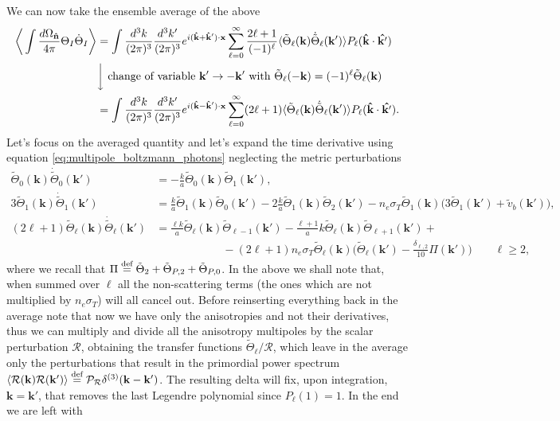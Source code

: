 We can now take the ensemble average of the above
\begin{align*}
    \bigg\langle\int\frac{d\Omega_{\mathbf{\hat{n}}}}{4\pi}\Theta_I\dot \Theta_I\bigg\rangle&=\int\frac{d^3k}{(2\pi)^3}\frac{d^3k'}{(2\pi)^3}e^{i(\mathbf{\hat{k}}+\mathbf{\hat{k}}')\cdot\mathbf{x}}\sum_{\ell=0}^{\infty}\frac{2\ell+1}{(-1)^{\ell}}\langle\tilde\Theta_\ell(\mathbf{k})\dot{\tilde\Theta}_{\ell}(\mathbf{k}')\rangle P_\ell(\mathbf{\hat{k}}\cdot\mathbf{\hat{k'}})\\
    &\bigg\downarrow\ \text{change of variable }\mathbf{k}'\rightarrow-\mathbf{k}'\text{ with } \tilde\Theta_\ell(-\mathbf{k})=(-1)^\ell \tilde\Theta_\ell(\mathbf{k})\\
    &=\int\frac{d^3k}{(2\pi)^3}\frac{d^3k'}{(2\pi)^3}e^{i(\mathbf{\hat{k}}-\mathbf{\hat{k}}')\cdot\mathbf{x}}\sum_{\ell=0}^{\infty}(2\ell+1)\langle\tilde\Theta_\ell(\mathbf{k})\dot{\tilde\Theta}_{\ell}(\mathbf{k}')\rangle P_\ell(\mathbf{\hat{k}}\cdot\mathbf{\hat{k'}}).
\end{align*}
Let's focus on the averaged quantity and let's expand the time derivative using equation \eqref{eq:multipole_boltzmann_photons} neglecting the metric perturbations
\begin{align*}
    \tilde\Theta_0(\mathbf{k})\dot{\tilde\Theta}_{0}(\mathbf{k}')&=-\frac{k}{a}\tilde\Theta_0(\mathbf{k})\tilde\Theta_1(\mathbf{k}'),&&\\
    3\tilde\Theta_1(\mathbf{k})\dot{\tilde\Theta}_{1}(\mathbf{k}')&=\frac{k}{a}\tilde\Theta_1(\mathbf{k})\tilde\Theta_0(\mathbf{k}')-2\frac{k}{a}\tilde\Theta_1(\mathbf{k})\tilde\Theta_2(\mathbf{k}')-n_e\sigma_T\tilde\Theta_1(\mathbf{k})\bigg( 3\tilde\Theta_1(\mathbf{k}')+\tilde v_b(\mathbf{k}') \bigg),&&\\
    (2\ell+1)\tilde\Theta_\ell(\mathbf{k})\dot{\tilde\Theta}_{\ell}(\mathbf{k}')&=\frac{\ell k}{a}\tilde\Theta_\ell(\mathbf{k})\tilde\Theta_{\ell-1}(\mathbf{k}')-\frac{\ell+1}{a}k\tilde\Theta_\ell(\mathbf{k})\tilde\Theta_{\ell+1}(\mathbf{k}')+\\&\qquad\qquad\qquad-(2\ell+1)n_e\sigma_T\tilde\Theta_\ell(\mathbf{k})\bigg(\tilde\Theta_\ell(\mathbf{k}')-\frac{\delta_{\ell,2}}{10}\Pi(\mathbf{k}')\bigg)\qquad\ell\geq2,&&
\end{align*}
where we recall that $\Pi\stackrel{\text{def}}{=}\tilde\Theta_2+\tilde\Theta_{P,2}+\tilde\Theta_{P,0}$. In the above we shall note that, when summed over $\ell$ all the non-scattering terms (the ones which are not multiplied by $n_e\sigma_T$) will all cancel out. Before reinserting everything back in the average note that now we have only the anisotropies and not their derivatives, thus we can multiply and divide all the anisotropy multipoles by the scalar perturbation $\mathcal{R}$, obtaining the transfer functions $\tilde\Theta_\ell/\mathcal{R}$, which leave in the average only the perturbations that result in the primordial power spectrum $\langle\mathcal{R}(\mathbf{k}) \mathcal{R}(\mathbf{k}') \rangle\stackrel{\text{def}}{=}\mathcal{P}_\mathcal{R} \delta^{(3)}(\mathbf{k}-\mathbf{k'})$. The resulting delta will fix, upon integration, $\mathbf{k}=\mathbf{k'}$, that removes the last Legendre polynomial since $P_\ell(1)=1$. In the end we are left with
